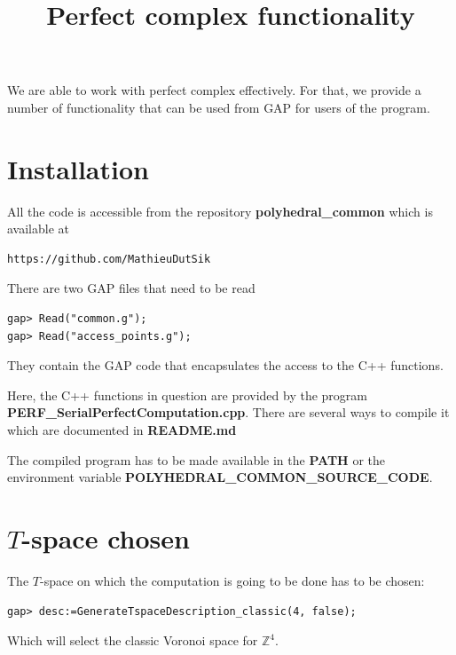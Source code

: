 \documentclass[12pt]{amsart}
\title{Perfect complex functionality}
\author{}
\begin{document}
\newcommand{\RR}{\ensuremath{\mathbb{R}}}
\newcommand{\NN}{\ensuremath{\mathbb{N}}}
\newcommand{\QQ}{\ensuremath{\mathbb{Q}}}
\newcommand{\CC}{\ensuremath{\mathbb{C}}}
\newcommand{\ZZ}{\ensuremath{\mathbb{Z}}}
\newcommand{\TT}{\ensuremath{\mathbb{T}}}
\newtheorem{prop}{Proposition}
\newtheorem{theor}{Theorem}
\newtheorem{cor}{Corollary}
\newtheorem{lem}{Lemma}
\newtheorem{conj}{Conjecture}
\newtheorem{claim}{Claim}
\newtheorem{remark}{Remark}
\newtheorem{definition}{Definition}

\maketitle
\thispagestyle{empty}

We are able to work with perfect complex effectively. For that, we provide a number of functionality that can be used from GAP for users of the program.



\section{Installation}

All the code is accessible from the repository {\bf polyhedral\_common} which is available at
\begin{verbatim}
https://github.com/MathieuDutSik
\end{verbatim}

There are two GAP files that need to be read
\begin{verbatim}
gap> Read("common.g");
gap> Read("access_points.g");
\end{verbatim}
They contain the GAP code that encapsulates the access to the C++ functions.

Here, the C++ functions in question are provided by the program {\bf PERF\_SerialPerfectComputation.cpp}. There are several ways to compile it which are documented in {\bf README.md}

The compiled program has to be made available in the {\bf PATH} or the environment variable {\bf POLYHEDRAL\_COMMON\_SOURCE\_CODE}.



\section{$T$-space chosen}

The $T$-space on which the computation is going to be done has to be chosen:
\begin{verbatim}
gap> desc:=GenerateTspaceDescription_classic(4, false);
\end{verbatim}
Which will select the classic Voronoi space for $\ZZ^4$.
\end{document}

